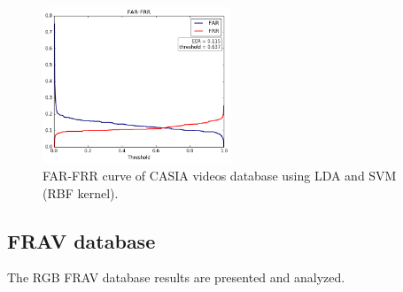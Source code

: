\begin{figure}[htb]
\centering
\includegraphics[width=0.5\textwidth]{images/FAR-FRR/Casia_vid_LDA_SVM_RBF_FAR_FRR.png}
\caption{FAR-FRR curve of CASIA videos database using LDA and SVM (RBF kernel).} \label{fig:CASIA_vid_FAR_FRR}
\end{figure}

\subsection{FRAV database}
The RGB FRAV database results are presented and analyzed.\\

